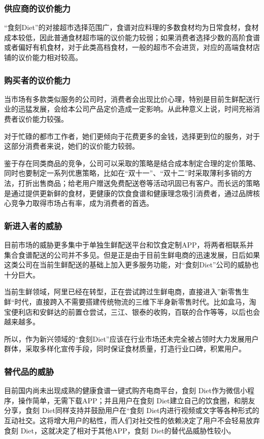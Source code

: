 \documentclass[UTF8,12pt]{ctexart}
\numberwithin{figure}{section}%
\begin{document}
\begin{spacing}{2}
\subsubsection{供应商的议价能力}
 “食刻Diet”的对接超市选择范围广，食谱对应料理的多数食材均为日常食材，食材成本较低，因此普通食材超市端的议价能力较弱；如果消费者选择少数的高阶食谱或者偏好有机食材，对于此类高档食材，一般的超市不会进货，对应的高端食材店铺的议价能力相对较高。
 
\subsubsection{购买者的议价能力}
当市场有多款类似服务的公司时，消费者会出现比价心理，特别是目前生鲜配送行业的迅猛发展，会给本公司产品定价造成一定影响。从此种意义上说，时间充裕消费者议价能力较强。

对于忙碌的都市工作者，她们更倾向于花费更多的金钱，选择更到位的服务，对于这部分消费者来说，她们的议价能力较弱。

鉴于存在同类商品的竞争，公司可以采取的策略是结合成本制定合理的定价策略、同时也要制定一系列优惠策略，比如在“双十一”、“双十二”时采取薄利多销的方法，打折出售商品；给老用户赠送免费配送卷等活动巩固已有客户。而长远的策略是通过提供更新鲜的食材，更健康的饮食食谱和健康理念吸引消费者，通过品牌核心竞争力取得市场占有率，成为消费者的首选。

\subsubsection{新进入者的威胁}
目前市场的威胁更多集中于单独生鲜配送平台和饮食定制APP，将两者相联系并集合食谱配送的公司并不多见。但是正是由于目前生鲜电商的迅速发展，日后如果这类公司在当前生鲜配送的基础上加入更多服务功能，对“食刻Diet”公司的威胁也十分巨大。

当前生鲜领域，阿里已经在转型，正在尝试跨过生鲜电商，直接进入”新零售生鲜“时代，直接跨入不需要搭建传统物流的三维下半身新零售时代。比如盒马，淘宝便利店和安鲜达的前置仓尝试，三江、银泰的收购，百联的合作等等，以后也会越来越多。

所以，作为新兴领域的“食刻Diet”应该在行业市场还未完全被占领时大力发展用户群体，采取多样化宣传手段，同时保证食材质量，打造行业口碑，积累用户。

\subsubsection{替代品的威胁}
目前国内尚未出现成熟的健康食谱一键式购齐电商平台，食刻 Diet作为微信小程序，操作简单，无需下载APP；并且用户在食刻 Diet建立自己的饮食圈，和朋友分享，食刻 Diet同样支持并鼓励用户在“食刻 Diet内进行视频或文字等各种形式的互动社交。这将增大用户的粘性，而人们对社交性的依赖决定了用户不会轻易放弃食刻 Diet，这就决定了相对于其他APP，食刻 Diet的替代品威胁性较小。


\end{spacing}
\end{document}
